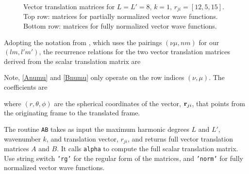 \begin{figure}[H]
   \caption{Vector translation matrices for $L = L' = 8$, $k = 1$, $r_{ji} = [12, 5, 15]$. Top row: matrices for partially normalized vector wave functions. Bottom row: matrices for fully normalized vector wave functions.}
   \label{transfullAB}
\end{figure}


Adopting the notation from \cite{chew1993efficient}, which uses the pairings $(\nu\mu,nm)$ for our $(lm,l'm')$, the recurrence relations for the two vector translation matrices derived from the scalar translation matrix are

Note, \eqref{Anumu} and \eqref{Bnumu} only operate on the row indices $(\nu,\mu)$. The coefficients are 

\noindent where $(r,\theta,\phi)$ are the spherical coordinates of the vector, $\mathbf{r}_{ji}$, that points from the originating frame to the translated frame.


The routine \texttt{AB} takes as input the maximum harmonic degrees $L$ and $L'$, wavenumber $k$, and translation vector, $r_{ji}$, and returns full vector translation matrices $A$ and $B$. It calls \texttt{alpha} to compute the full scalar translation matrix. Use string switch \texttt{'rg'} for the regular form of the matrices, and \texttt{'norm'} for fully normalized vector wave functions. 



{\footnotesize
{}
}




